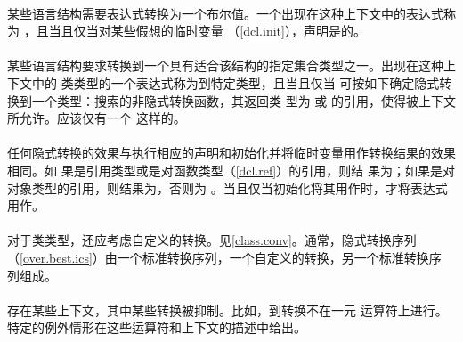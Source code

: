 \paragraph{} %
某些语言结构需要表达式转换为一个布尔值。一个出现在这种上下文中的表达式称为
，且当且仅当对某些假想的临时变量
（\ref{dcl.init}），声明\tm{);}是\wellform{}的。

\paragraph{} %
某些语言结构要求转换到一个具有适合该结构的指定集合类型之一。出现在这种上下文中的
类类型的一个表达式称为到特定类型，且当且仅当
可按如下确定隐式转换到一个类型：搜索的非隐式转换函数，其返回类
型为 或 的引用，使得被上下文所允许。应该仅有一个
这样的。

\paragraph{} %
任何隐式转换的效果与执行相应的声明和初始化并将临时变量用作转换结果的效果相同。如
果是\lvalue{}引用类型或是对函数类型（\ref{dcl.ref}）的\rvalue{}引用，则结
果为\lvalue{}；如果是对对象类型的\rvalue{}引用，则结果为\xvalue{}，否则为
\prvalue{}。当且仅当初始化将其用作\glvalue{}时，才将表达式用作\glvalue{}。

\paragraph{} %
\begin{note}
  对于类类型，还应考虑自定义的转换。见\ref{class.conv}。通常，隐式转换序列
  （\ref{over.best.ics}）由一个标准转换序列，一个自定义的转换，另一个标准转换序
  列组成。
\end{note}

\paragraph{} %
\begin{note}
  存在某些上下文，其中某些转换被抑制。比如，\lvalue{}到\rvalue{}转换不在一元
  \tm{\&}运算符上进行。特定的例外情形在这些运算符和上下文的描述中给出。
\end{note}
